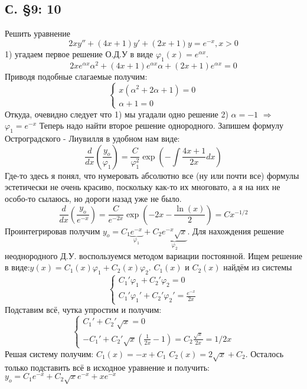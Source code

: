 \documentclass{article}
\begin{document}
\subsection{С. \S9: 10 }
Решить уравнение 
\begin{equation}
    2 x y'' + (4x+1)y' + (2x+1)y=e^{-x}, x>0
\end{equation}
1) угадаем первое решение О.Д.У в виде $\varphi_1(x)=e^{\alpha x}$.
\begin{equation}
    2x e^{\alpha x} \alpha^2 + (4x+1)e^{\alpha x}\alpha + (2x+1) e^{\alpha x}=0
\end{equation}
Приводя подобные слагаемые получим:
\begin{equation}
    \begin{cases}
    x(\alpha^2+2 \alpha +1)=0   \\
        \alpha +1 =0
    \end{cases}
\end{equation}
Откуда, очевидно следует что 1) мы угадали одно решение 2) $\alpha =-1$ $\Rightarrow$ $\varphi_1=e^{-x}$
Теперь надо найти второе решение однородного. Запишем формулу Остроградского - Лиувилля в удобном нам виде:
\begin{equation}
    \frac{d}{dx} \left( \frac{y_o}{\varphi_1} \right)= \frac{C}{\varphi_1^2} \exp \left( - \int \frac{4x+1} {2x}dx  \right) 
\end{equation}
\textcolor[rgb]{1,1,1}{Где-то здесь я понял, что нумеровать абсолютно все (ну или почти все) формулы эстетически не очень красиво, поскольку как-то их многовато, а я на них не особо-то сылаюсь, но дороги назад уже не было. }
\begin{equation}
    \frac{d}{dx} \left( \frac{y_o}{e^{-x}} \right)= \frac{C}{e^{-2x}} \exp \left(-2x - \frac{\ln(x)}{2}  \right) = C x^{-1/2}
\end{equation}
Проинтегрировав получим $y_o=C_1 \underbrace{e^{-x}}_{\varphi_1}+ C_2 \underbrace{e^{-x} \sqrt x}_{\varphi_2}$. 
Для нахождения решение неоднородного Д.У. воспользуемся методом вариации постоянной. 
Ищем решение в виде:$y(x)=C_1(x)\varphi_1 + C_2(x) \varphi_2$. $C_1(x)$ и $C_2(x)$ найдём из системы
\begin{equation}
    \begin{cases}
        C_1' \varphi_1+C_2'\varphi_2=0\\
        C_1' \varphi_1'+C_2'\varphi_2'=\frac{e^{-x}}{2x}
    \end{cases}
\end{equation}
Подставим всё, чутка упростим и получим:
\begin{equation}
    \begin{cases}
        C_1'+C_2' \sqrt x = 0\\
        -C_1'+C_2' \sqrt x (\frac{1}{2x}-1)=C_2 \frac{\sqrt x }{2x}=1/2x
    \end{cases}
\end{equation}
Решая систему получим: $C_1(x)= -x + C_1$ $C_2(x)=2 \sqrt x + C_2$. Осталось только подставить всё в исходное уравнение и получить: $y_o=C_1 e^{-x}+C_2\sqrt x e^{-x} + x e^{-x}$ 
\end{document}
